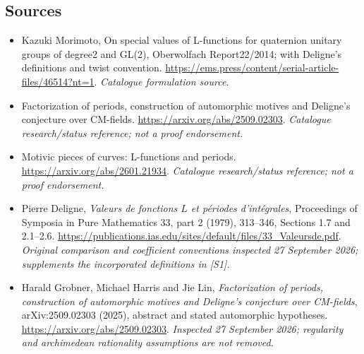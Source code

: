 \documentclass[11pt,a4paper]{article}
\numberwithin{equation}{section}
\begin{document}
\subsection{Sources}
\begin{itemize}\raggedright
\item[\textnormal{[S1]}]\hypertarget{source:30002589:1}{} Kazuki Morimoto, On special values of L-functions for quaternion unitary groups of degree2 and GL(2), Oberwolfach Report22/2014; with Deligne's definitions and twist convention.
\url{https://ems.press/content/serial-article-files/46514?nt=1}.
{\small\textit{Catalogue formulation source.}}
\item[\textnormal{[S2]}]\hypertarget{source:30002589:2}{} Factorization of periods, construction of automorphic motives and Deligne's conjecture over CM-fields.
\url{https://arxiv.org/abs/2509.02303}.
{\small\textit{Catalogue research/status reference; not a proof endorsement.}}
\item[\textnormal{[S3]}]\hypertarget{source:30002589:3}{} Motivic pieces of curves: L-functions and periods.
\url{https://arxiv.org/abs/2601.21934}.
{\small\textit{Catalogue research/status reference; not a proof endorsement.}}
\item[\textnormal{[E1]}]\hypertarget{extra:30002589:1}{} Pierre Deligne,
\emph{Valeurs de fonctions $L$ et p\'eriodes d'int\'egrales},
Proceedings of Symposia in Pure Mathematics 33, part 2 (1979), 313--346,
Sections 1.7 and 2.1--2.6.
\url{https://publications.ias.edu/sites/default/files/33_Valeursde.pdf}.
{\small\textit{Original comparison and coefficient conventions inspected
27 September 2026; supplements the incorporated definitions in [S1].}}
\item[\textnormal{[E2]}]\hypertarget{extra:30002589:2}{} Harald Grobner,
Michael Harris and Jie Lin, \emph{Factorization of periods, construction of
automorphic motives and Deligne's conjecture over CM-fields},
arXiv:2509.02303 (2025), abstract and stated automorphic hypotheses.
\url{https://arxiv.org/abs/2509.02303}.
{\small\textit{Inspected 27 September 2026; regularity and archimedean
rationality assumptions are not removed.}}
\end{itemize}
\end{document}
